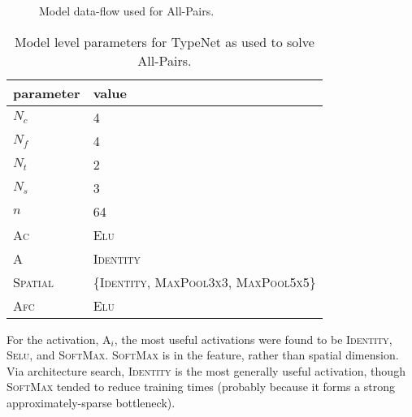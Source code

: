 \begin{figure*}[!htb]
{
}
\caption{Model data-flow used for All-Pairs.}
\label{typenet_fig_sup}
\end{figure*}

\begin{table}[!htb]
  \centering%
    \begin{tabular}{ l l }
    parameter & value \\
    \hline
    $N_c$ & 4  \\
    $N_f$ & 4  \\
    $N_t$ & 2  \\
    $N_s$ & 3  \\
    $n$ & 64  \\
    \textsc{Ac} & \textsc{Elu}  \\
    \textsc{A} & \textsc{Identity}  \\
    \textsc{Spatial} & \{\textsc{Identity}, \textsc{MaxPool3x3}, \textsc{MaxPool5x5}\}  \\
    \textsc{Afc} & \textsc{Elu}  \\
    \end{tabular}
  \caption{Model level parameters for TypeNet as used to solve All-Pairs.}\label{global_config}
\end{table}

\noindent
For the activation, \textsc{A}$_i$, the most useful activations were found to be \textsc{Identity}, \textsc{Selu}, and
\textsc{SoftMax}.  \textsc{SoftMax} is in the feature, rather than spatial
dimension.  Via architecture search, \textsc{Identity} is the most generally useful activation, though \textsc{SoftMax} tended to reduce training times (probably because it forms a strong approximately-sparse bottleneck).  

